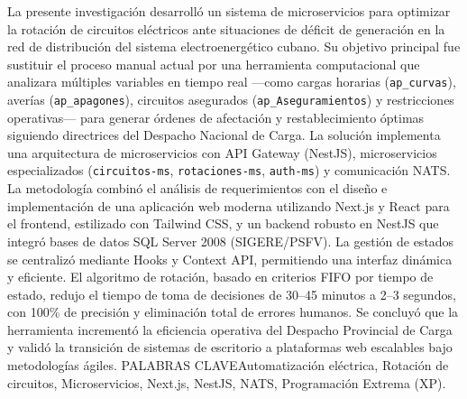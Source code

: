 \ResumenAbstract
{%
La presente investigación desarrolló un sistema de microservicios para optimizar la rotación de circuitos eléctricos ante situaciones de déficit de generación en la red de distribución del sistema electroenergético cubano. Su objetivo principal fue sustituir el proceso manual actual por una herramienta computacional que analizara múltiples variables en tiempo real ---como cargas horarias (\texttt{ap\_curvas}), averías (\texttt{ap\_apagones}), circuitos asegurados (\texttt{ap\_Aseguramientos}) y restricciones operativas--- para generar órdenes de afectación y restablecimiento óptimas siguiendo directrices del Despacho Nacional de Carga. La solución implementa una arquitectura de microservicios con API Gateway (NestJS), microservicios especializados (\texttt{circuitos-ms}, \texttt{rotaciones-ms}, \texttt{auth-ms}) y comunicación NATS. La metodología combinó el análisis de requerimientos con el diseño e implementación de una aplicación web moderna utilizando Next.js y React para el frontend, estilizado con Tailwind CSS, y un backend robusto en NestJS que integró bases de datos SQL Server 2008 (SIGERE/PSFV). La gestión de estados se centralizó mediante Hooks y Context API, permitiendo una interfaz dinámica y eficiente. El algoritmo de rotación, basado en criterios FIFO por tiempo de estado, redujo el tiempo de toma de decisiones de 30--45 minutos a 2--3 segundos, con 100\% de precisión y eliminación total de errores humanos. Se concluyó que la herramienta incrementó la eficiencia operativa del Despacho Provincial de Carga y validó la transición de sistemas de escritorio a plataformas web escalables bajo metodologías ágiles. \noindent PALABRAS CLAVE\newline Automatización eléctrica, Rotación de circuitos, Microservicios, Next.js, NestJS, NATS, Programación Extrema (XP).
}
